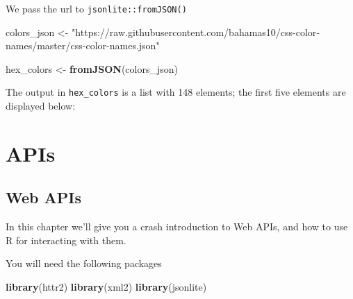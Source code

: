 \documentclass[
]{book}
\newenvironment{Shaded}{\begin{snugshade}}{\end{snugshade}}
\newcommand{\CommentTok}[1]{\textcolor[rgb]{0.56,0.35,0.01}{\textit{#1}}}
\newcommand{\DecValTok}[1]{\textcolor[rgb]{0.00,0.00,0.81}{#1}}
\newcommand{\FunctionTok}[1]{\textcolor[rgb]{0.13,0.29,0.53}{\textbf{#1}}}
\newcommand{\NormalTok}[1]{#1}
\newcommand{\OtherTok}[1]{\textcolor[rgb]{0.56,0.35,0.01}{#1}}
\newcommand{\SpecialCharTok}[1]{\textcolor[rgb]{0.81,0.36,0.00}{\textbf{#1}}}
\newcommand{\StringTok}[1]{\textcolor[rgb]{0.31,0.60,0.02}{#1}}
\begin{document}
We pass the url to \texttt{jsonlite::fromJSON()}

\begin{Shaded}
\begin{Highlighting}[]
\NormalTok{colors\_json }\OtherTok{\textless{}{-}} \StringTok{"https://raw.githubusercontent.com/bahamas10/css{-}color{-}names/master/css{-}color{-}names.json"}

\NormalTok{hex\_colors }\OtherTok{\textless{}{-}} \FunctionTok{fromJSON}\NormalTok{(colors\_json)}
\end{Highlighting}
\end{Shaded}

The output in \texttt{hex\_colors} is a list with 148 elements;
the first five elements are displayed below:

\begin{Shaded}
\end{Shaded}

\hypertarget{part-apis}{%
\part{APIs}\label{part-apis}}

\hypertarget{apis}{%
\chapter{Web APIs}\label{apis}}

In this chapter we'll give you a crash introduction to Web APIs, and how to
use R for interacting with them.

You will need the following packages

\begin{Shaded}
\begin{Highlighting}[]
\FunctionTok{library}\NormalTok{(httr2)}
\FunctionTok{library}\NormalTok{(xml2)}
\FunctionTok{library}\NormalTok{(jsonlite)}
\end{Highlighting}
\end{Shaded}
\end{document}
